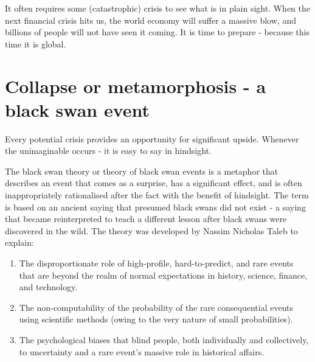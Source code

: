 It often requires some (catastrophic) crisis to see what is in plain sight. When the next financial crisis hits us, the world economy will suffer a massive blow, and billions of people will not have seen it coming. It is time to prepare - because this time it is global.



\section*{Collapse or metamorphosis - a black swan event}
Every potential crisis provides an opportunity for significant upside. Whenever the unimaginable occurs - it is easy to say  in hindsight. 

 \medskip
    \begin{tcolorbox}
    [enhanced,
    title=Black swan theory,
    frame style=
    {left color=orange!85!black,right color=yellow!95!black}]

 The black swan theory or theory of black swan events is a metaphor that describes an event that comes as a surprise, has a significant effect, and is often inappropriately rationalised after the fact with the benefit of hindsight. The term is based on an ancient saying that presumed black swans did not exist - a saying that became reinterpreted to teach a different lesson after black swans were discovered in the wild. The theory was developed by Nassim Nicholas Taleb \cite{Nassim} to explain:   

\tcblower

\footnotesize \begin{enumerate}
                    \item The disproportionate role of high-profile, hard-to-predict, and rare events that are beyond the realm of normal expectations in history, science, finance, and technology.
                    \item The non-computability of the probability of the rare consequential events using scientific methods (owing to the very nature of small probabilities).
                    \item The psychological biases that blind people, both individually and collectively, to uncertainty and a rare event's massive role in historical affairs.
                \end{enumerate}

\end{tcolorbox}
\medskip


